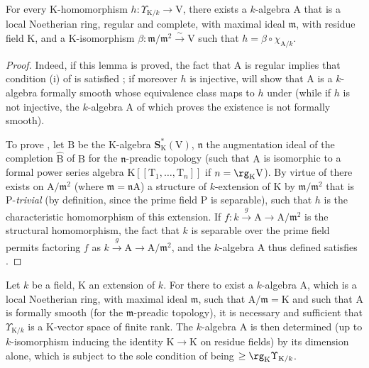 \begin{lemma}[22.2.5.2]
\label{0.22.2.5.2}
For every $\mathrm{K}$-homomorphism $h:\Upsilon_{\mathrm{K}/k}\to\mathrm{V}$, there exists a $k$-algebra $\mathrm{A}$ that is a local Noetherian ring, regular and complete, with maximal ideal $\mathfrak{m}$, with residue field $\mathrm{K}$, and a $\mathrm{K}$-isomorphism $\beta:\mathfrak{m}/\mathfrak{m}^2\xrightarrow{\sim}\mathrm{V}$ such that $h=\beta\circ\chi_{\mathrm{A}/k}$.
\end{lemma}

\begin{proof}
Indeed, if this lemma is proved, the fact that $\mathrm{A}$ is regular implies that condition (i) of  is satisfied ; if moreover $h$ is injective,  will show that $\mathrm{A}$ is a $k$-algebra formally smooth whose equivalence class maps to $h$ under  (while if $h$ is not injective, the $k$-algebra $\mathrm{A}$ of which  proves the existence is not formally smooth).

To prove , let $\mathrm{B}$ be the $\mathrm{K}$-algebra $\mathbf{S}^*_\mathrm{K}(\mathrm{V})$, $\mathfrak{n}$ the augmentation ideal of the completion $\widehat{\mathrm{B}}$ of $\mathrm{B}$ for the $\mathfrak{n}$-preadic topology (such that $\mathrm{A}$ is isomorphic to a formal power series algebra $\mathrm{K}[[\mathrm{T}_1,\ldots,\mathrm{T}_n]]$ if $n=\rg_\mathrm{K}\mathrm{V}$).
By virtue of  there exists on $\mathrm{A}/\mathfrak{m}^2$ (where $\mathfrak{m}=\mathfrak{n}\mathrm{A}$) a structure of $k$-extension of $\mathrm{K}$ by $\mathfrak{m}/\mathfrak{m}^2$ that is $\mathrm{P}$-\emph{trivial} (by definition, since the prime field $\mathrm{P}$ is separable), such that $h$ is the characteristic homomorphism of this extension.
If $f:k\xrightarrow{g}\mathrm{A}\to\mathrm{A}/\mathfrak{m}^2$ is the structural homomorphism, the fact that $k$ is separable over the prime field permits  factoring $f$ as $k\xrightarrow{g}\mathrm{A}\to\mathrm{A}/\mathfrak{m}^2$, and the $k$-algebra $\mathrm{A}$ thus defined satisfies .
\end{proof}

\begin{theorem}[22.2.6]
\label{0.22.2.6}
Let $k$ be a field, $\mathrm{K}$ an extension of $k$.
For there to exist a $k$-algebra $\mathrm{A}$, which is a local Noetherian ring, with maximal ideal $\mathfrak{m}$, such that $\mathrm{A}/\mathfrak{m}=\mathrm{K}$ and such that $\mathrm{A}$ is formally smooth (for the $\mathfrak{m}$-preadic topology), it is necessary and sufficient that $\Upsilon_{\mathrm{K}/k}$ is a $\mathrm{K}$-vector space of finite rank.
The $k$-algebra $\mathrm{A}$ is then determined (up to $k$-isomorphism inducing the identity $\mathrm{K}\to\mathrm{K}$ on residue fields) by its dimension alone, which is subject to the sole condition of being $\geq\rg_\mathrm{K}\Upsilon_{\mathrm{K}/k}$.
\end{theorem}

